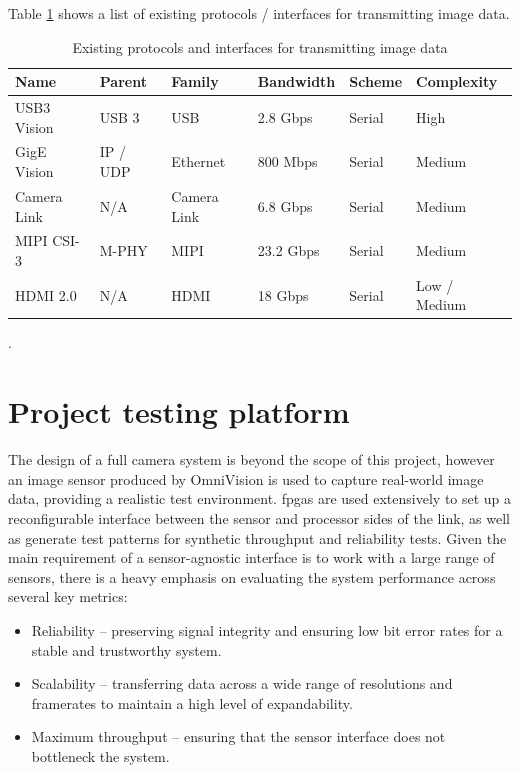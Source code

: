 \documentclass[a4paper]{report}
\begin{document}
Table \ref{table:existing_protocols} shows a list of existing protocols / interfaces for transmitting image data.

\begin{table}
  \centering
  \begin{tabular}{llllll}
  Name      & Parent  & Family    & Bandwidth & Scheme  & Complexity \\
  \hline
  USB3 Vision   & USB 3   & USB       & 2.8 Gbps  & Serial  & High \\
  GigE Vision   & IP / UDP  & Ethernet    & 800 Mbps  & Serial  & Medium \\
  Camera Link   & N/A     & Camera Link   & 6.8 Gbps  & Serial  & Medium \\
  MIPI CSI-3  & M-PHY   & MIPI      & 23.2 Gbps & Serial  & Medium \\
  HDMI 2.0    & N/A     & HDMI      & 18 Gbps   & Serial  & Low / Medium
  \end{tabular}
  \caption{Existing protocols and interfaces for transmitting image data      \protect\cite{16_von_fintel_2013,17_arrowdevices.com_2014,18_hdmi.org}}.
  \label{table:existing_protocols}
\end{table}

\section{Project testing platform}

The design of a full camera system is beyond the scope of this project, however an image sensor produced by OmniVision is used to capture real-world image data, providing a realistic test environment. \Glspl{fpga} are used extensively to set up a reconfigurable interface between the sensor and processor sides of the link, as well as generate test patterns for synthetic throughput and reliability tests. Given the main requirement of a sensor-agnostic interface is to work with a large range of sensors, there is a heavy emphasis on evaluating the system performance across several key metrics:

\begin{itemize}
  \item Reliability -- preserving signal integrity and ensuring low bit error rates for a stable and trustworthy system.
  \item Scalability -- transferring data across a wide range of resolutions and framerates to maintain a high level of expandability.
  \item Maximum throughput -- ensuring that the sensor interface does not bottleneck the system.
\end{itemize}
\end{document}
